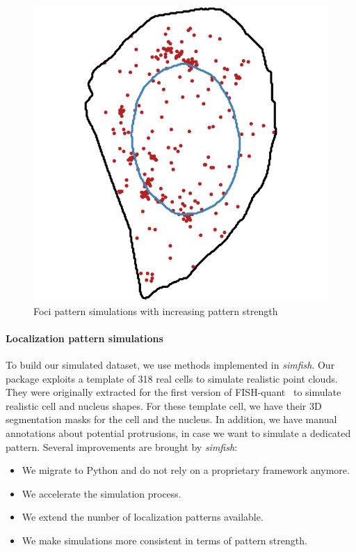 \begin{figure}[h]
	\endminipage\hfill
		\includegraphics[width=\linewidth]{figures/chapter4/simulation_foci_90}
	\endminipage
	\caption{Foci pattern simulations with increasing pattern strength}
	\label{fig:foci_panel}
\end{figure}

\paragraph{Localization pattern simulations}

To build our simulated dataset, we use methods implemented in \emph{simfish}.
Our package exploits a template of 318 real cells to simulate realistic point clouds.
They were originally extracted for the first version of FISH-quant~\cite{samacoits_computational_2018} to simulate realistic cell and nucleus shapes.
For these template cell, we have their 3D segmentation masks for the cell and the nucleus.
In addition, we have manual annotations about potential protrusions, in case we want to simulate a dedicated pattern.
Several improvements are brought by \emph{simfish}:
\begin{itemize}
	\item We migrate to Python and do not rely on a proprietary framework anymore.
	\item We accelerate the simulation process.
	\item We extend the number of localization patterns available.
	\item We make simulations more consistent in terms of pattern strength.
\end{itemize}

